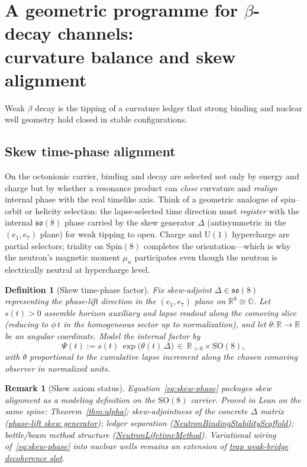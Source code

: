\documentclass[11pt,notitlepage]{amsart}
\newtheorem{definition}[theorem]{Definition}
\newtheorem{remark}[theorem]{Remark}
\begin{document}
\section{A geometric programme for $\beta$-decay channels:\\
curvature balance and skew alignment}
\label{sec:beta-programme}

Weak $\beta$ decay is the tipping of a curvature ledger that strong binding and nuclear
well geometry hold closed in stable configurations.

\subsection{Skew time-phase alignment}
\label{sec:skew-alignment}

On the octonionic carrier, binding and decay are selected not only by energy and
charge but by whether a resonance product can \emph{close} curvature and \emph{realign}
internal phase with the real timelike axis. Think of a geometric analogue of
spin--orbit or helicity selection: the lapse-selected time direction must
\emph{register} with the internal $\mathfrak{so}(8)$ phase carried by the skew generator
$\Delta$ (antisymmetric in the $(e_1,e_7)$ plane) for weak tipping to open. Charge
and $\mathrm{U}(1)$ hypercharge are partial selectors; triality on Spin$(8)$ completes
the orientation---which is why the neutron's magnetic moment $\mu_n$ participates even
though the neutron is electrically neutral at hypercharge level.

\begin{definition}[Skew time-phase factor]\label{def:skew-phase}
Fix skew-adjoint $\Delta\in\mathfrak{so}(8)$ representing the phase-lift direction in
the $(e_1,e_7)$ plane on $\mathbb{R}^8\cong\mathbb{O}$. Let $s(t)>0$ assemble horizon
auxiliary and lapse readout along the comoving slice (reducing to $\phi\,t$ in the
homogeneous sector up to normalization), and let $\theta:\mathbb{R}\to\mathbb{R}$ be an
angular coordinate. Model the internal factor by
\begin{equation}\label{eq:skew-phase}
  \Psi(t) := s(t)\,\exp\!\bigl(\theta(t)\,\Delta\bigr)\,\in\,\mathbb{R}_{>0}\times \mathrm{SO}(8),
\end{equation}
with $\dot{\theta}$ proportional to the cumulative lapse increment along the chosen
comoving observer in normalized units.
\end{definition}

\begin{remark}[Skew axiom status]
Equation~\eqref{eq:skew-phase} packages skew alignment as a modeling definition on the
$\mathrm{SO}(8)$ carrier. Proved in Lean on the same spine: Theorem~\ref{thm:alpha};
skew-adjointness of the concrete $\Delta$ matrix
(\hyperref[lean:phase-lift-delta]{phase-lift skew generator}); ledger separation
(\hyperref[lean:neutron-scaffold]{NeutronBindingStabilityScaffold}); bottle/beam method
structure (\hyperref[lean:neutron-lifetime-method]{NeutronLifetimeMethod}). Variational
wiring of~\eqref{eq:skew-phase} into nuclear wells remains an extension of
\hyperref[lean:neutron-lifetime-method]{trap weak-bridge decoherence slot}.
\end{remark}
\end{document}

